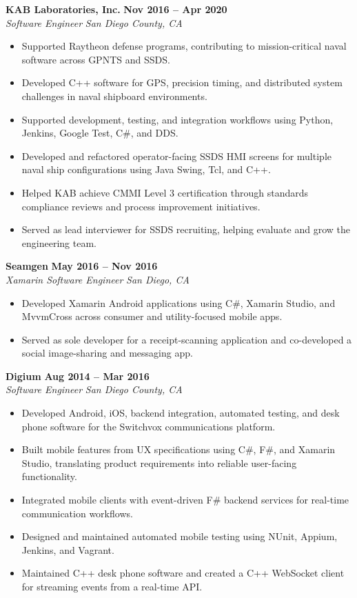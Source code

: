 \documentclass[10pt,letterpaper]{article}
\newcommand{\job}[4]{
  \textbf{#1} \hfill \textbf{#2} \\
  \textit{#3} \hfill \textit{#4}
}
\begin{document}
\job
  {KAB Laboratories, Inc.}
  {Nov 2016 -- Apr 2020}
  {Software Engineer}
  {San Diego County, CA}

\begin{itemize}
  \item Supported Raytheon defense programs, contributing to mission-critical naval software across GPNTS and SSDS.
  \item Developed C++ software for GPS, precision timing, and distributed system challenges in naval shipboard environments.
  \item Supported development, testing, and integration workflows using Python, Jenkins, Google Test, C\#, and DDS.
  \item Developed and refactored operator-facing SSDS HMI screens for multiple naval ship configurations using Java Swing, Tcl, and C++.
  \item Helped KAB achieve CMMI Level 3 certification through standards compliance reviews and process improvement initiatives.
  \item Served as lead interviewer for SSDS recruiting, helping evaluate and grow the engineering team.
\end{itemize}

\job
  {Seamgen}
  {May 2016 -- Nov 2016}
  {Xamarin Software Engineer}
  {San Diego, CA}

\begin{itemize}
  \item Developed Xamarin Android applications using C\#, Xamarin Studio, and MvvmCross across consumer and utility-focused mobile apps.
  \item Served as sole developer for a receipt-scanning application and co-developed a social image-sharing and messaging app.
\end{itemize}

\job
  {Digium}
  {Aug 2014 -- Mar 2016}
  {Software Engineer}
  {San Diego County, CA}

\begin{itemize}
  \item Developed Android, iOS, backend integration, automated testing, and desk phone software for the Switchvox communications platform.
  \item Built mobile features from UX specifications using C\#, F\#, and Xamarin Studio, translating product requirements into reliable user-facing functionality.
  \item Integrated mobile clients with event-driven F\# backend services for real-time communication workflows.
  \item Designed and maintained automated mobile testing using NUnit, Appium, Jenkins, and Vagrant.
  \item Maintained C++ desk phone software and created a C++ WebSocket client for streaming events from a real-time API.
\end{itemize}
\end{document}

